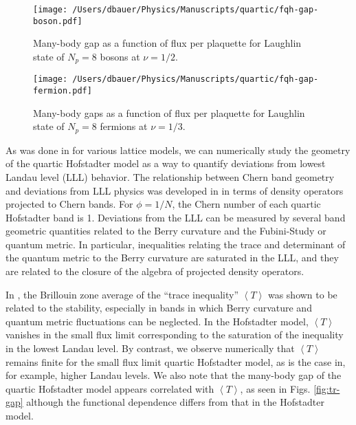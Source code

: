 \documentclass[aps,twocolumn,letterpaper,twoside,nobalancelastpage,groupedaddress,amsmath,amssymb,floatfix,citeautoscript]{revtex4-1}
\begin{document}
\begin{figure}[bht]
\centering
\texttt{[image: /Users/dbauer/Physics/Manuscripts/quartic/fqh-gap-boson.pdf]}
\caption{\label{fig:boson-gap}Many-body gap as a function of flux per plaquette for Laughlin state of $N_{p}=8$ bosons at $\nu = 1/2$.}
\end{figure}

\begin{figure}[bht]
\centering
\texttt{[image: /Users/dbauer/Physics/Manuscripts/quartic/fqh-gap-fermion.pdf]}
\caption{\label{fig:fermion-gap}Many-body gaps as a function of flux per plaquette for Laughlin state of $N_{p}=8$ fermions at $\nu = 1/3$.}
\end{figure}


As was done in \cite{Jackson:2015aa,Bauer:2016aa} for various lattice models, we can numerically study the geometry of the quartic Hofstadter model as a way to quantify deviations from lowest Landau level (LLL) behavior. The relationship between Chern band geometry and deviations from LLL physics was developed in \cite{Roy:2012vo} in terms of density operators projected to Chern bands. For $\phi=1/N$, the Chern number of each quartic Hofstadter band is 1. Deviations from the LLL can be measured by several band geometric quantities related to the Berry curvature and the Fubini-Study or quantum metric. In particular, inequalities relating the trace and determinant of the quantum metric to the Berry curvature are saturated in the LLL, and they are related to the closure of the algebra of projected density operators.

In \cite{Bauer:2016aa}, the Brillouin zone average of the ``trace inequality'' $\left<T\right>$ was shown to be related to the stability, especially in bands in which Berry curvature and quantum metric fluctuations can be neglected. In the Hofstadter model, $\left<T\right>$ vanishes in the small flux limit corresponding to the saturation of the inequality in the lowest Landau level. By contrast, we observe numerically that $\left<T\right>$ remains finite for the small flux limit quartic Hofstadter model, as is the case in, for example, higher Landau levels. We also note that the many-body gap of the quartic Hofstadter model appears correlated with $\left<T\right>$, as seen in Figs. \ref{fig:tr-gap} although the functional dependence differs from that in the Hofstadter model.
\end{document}
